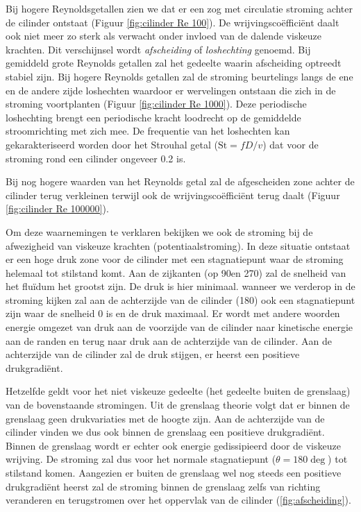 Bij hogere Reynoldsgetallen zien we dat er een zog met circulatie stroming achter de cilinder ontstaat (Figuur \ref{fig:cilinder Re 100}). De wrijvingscoëfficiënt daalt ook niet meer zo sterk als verwacht onder invloed van de dalende viskeuze krachten. Dit verschijnsel wordt \emph{afscheiding} of \emph{loshechting} genoemd. Bij gemiddeld grote Reynolds getallen zal het gedeelte waarin afscheiding optreedt stabiel zijn. Bij hogere Reynolds getallen zal de stroming beurtelings langs de ene en de andere zijde loshechten waardoor er wervelingen ontstaan die zich in de stroming voortplanten (Figuur \ref{fig:cilinder Re 1000}). Deze periodische loshechting brengt een periodische kracht loodrecht op de gemiddelde stroomrichting met zich mee. De frequentie van het loshechten kan gekarakteriseerd worden door het Strouhal getal ($\text{St} = fD/v$) dat voor de stroming rond een cilinder ongeveer 0.2 is.

Bij nog hogere waarden van het Reynolds getal zal de afgescheiden zone achter de cilinder terug verkleinen terwijl ook de wrijvingscoëfficiënt terug daalt (Figuur \ref{fig:cilinder Re 100000}).

Om deze waarnemingen te verklaren bekijken we ook de stroming bij de afwezigheid van viskeuze krachten (potentiaalstroming). In deze situatie ontstaat er een hoge druk zone voor de cilinder met een stagnatiepunt waar de stroming helemaal tot stilstand komt. Aan de zijkanten (op 90\deg en 270\deg) zal de snelheid van het fluïdum het grootst zijn. De druk is hier minimaal. wanneer we verderop in de stroming kijken zal aan de achterzijde van de cilinder (180\deg) ook een stagnatiepunt zijn waar de snelheid $0$ is en de druk maximaal. Er wordt met andere woorden energie omgezet van druk aan de voorzijde van de cilinder naar kinetische energie aan de randen en terug naar druk aan de achterzijde van de cilinder. Aan de achterzijde van de cilinder zal de druk stijgen, er heerst een positieve drukgradiënt.

Hetzelfde geldt voor het niet viskeuze gedeelte (het gedeelte buiten de grenslaag) van de bovenstaande stromingen. Uit de grenslaag theorie volgt dat er binnen de grenslaag geen drukvariaties met de hoogte zijn. Aan de achterzijde van de cilinder vinden we dus ook binnen de grenslaag een positieve drukgradiënt. Binnen de grenslaag wordt er echter ook energie gedissipieerd door de viskeuze wrijving. De stroming zal dus voor het normale stagnatiepunt ($\theta = 180\deg$) tot stilstand komen. Aangezien er buiten de grenslaag wel nog steeds een positieve drukgradiënt heerst zal de stroming binnen de grenslaag zelfs van richting veranderen en terugstromen over het oppervlak van de cilinder (\ref{fig:afscheiding}).

